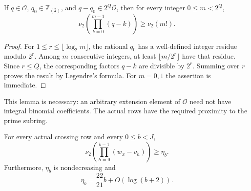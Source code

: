\begin{lemma}
\label{lem:pivot21-near-prime}
If $q\in\mathcal O$, $q_0\in\mathbb Z_{(2)}$, and
$q-q_0\in2^Q\mathcal O$, then for every integer $0\le m<2^Q$,
\[
 \nu_2\!\left(\prod_{k=0}^{m-1}(q-k)\right)\ge\nu_2(m!).
\]
\end{lemma}

\begin{proof}
For $1\le r\le\lfloor\log_2m\rfloor$, the rational $q_0$ has a
well-defined integer residue modulo $2^r$. Among $m$ consecutive
integers, at least $\lfloor m/2^r\rfloor$ have that residue.
Since $r\le Q$, the corresponding factors $q-k$ are divisible by
$2^r$. Summing over $r$ proves the result by Legendre's formula.
For $m=0,1$ the assertion is immediate.
\end{proof}

This lemma is necessary: an arbitrary extension element of $\mathcal O$
need not have integral binomial coefficients. The actual rows have the
required proximity to the prime subring.

\begin{lemma}
\label{lem:pivot21-product}
For every actual crossing row and every $0\le b<J$,
\[
 \nu_2\!\left(\prod_{h=0}^{b-1}(w_x-v_h)\right)\ge\eta_b.
\]
Furthermore, $\eta_b$ is nondecreasing and
\[
 \eta_b=\frac{22}{21}b+O(\log(b+2)).
\]
\end{lemma}

